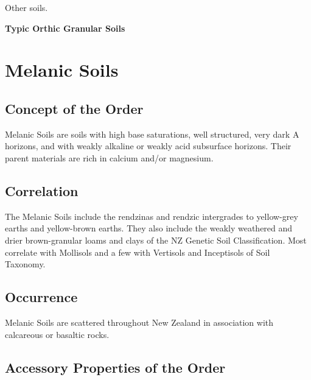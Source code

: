 \documentclass[
  letterpaper,
  DIV=11,
  numbers=noendperiod]{scrreprt}
\begin{document}
Other soils.

\textbf{Typic Orthic Granular Soils}


\hypertarget{sec-ord-E}{%
\chapter{Melanic Soils}\label{sec-ord-E}}

\hypertarget{sec-con-E}{%
\section{Concept of the Order}\label{sec-con-E}}

Melanic Soils are soils with high base saturations, well structured,
very dark A horizons, and with weakly alkaline or weakly acid subsurface
horizons. Their parent materials are rich in calcium and/or magnesium.

\hypertarget{sec-cor-E}{%
\section{Correlation}\label{sec-cor-E}}

The Melanic Soils include the rendzinas and rendzic intergrades to
yellow-grey earths and yellow-brown earths. They also include the weakly
weathered and drier brown-granular loams and clays of the NZ Genetic
Soil Classification. Most correlate with Mollisols and a few with
Vertisols and Inceptisols of Soil Taxonomy.

\hypertarget{sec-occ-E}{%
\section{Occurrence}\label{sec-occ-E}}

Melanic Soils are scattered throughout New Zealand in association with
calcareous or basaltic rocks.

\hypertarget{sec-acc-E}{%
\section{Accessory Properties of the Order}\label{sec-acc-E}}
\end{document}
